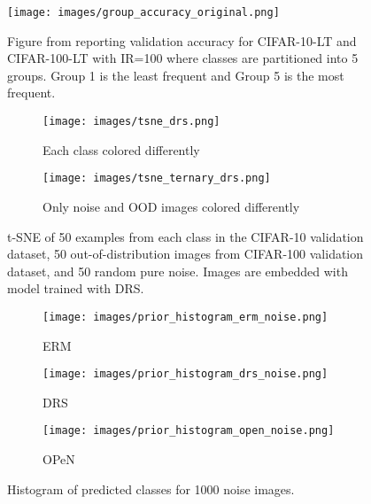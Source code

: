 \begin{figure}[!ht]
    \centering
    \texttt{[image: images/group\_accuracy\_original.png]}
    \caption{Figure from \citet{PureNoise} reporting validation accuracy for CIFAR-10-LT and CIFAR-100-LT with IR=100 where classes are partitioned into 5 groups. Group 1 is the least frequent and Group 5 is the most frequent.}
    \label{fig:group_accuracy_original}
\end{figure}


\begin{figure}[!ht]
    \centering
    \begin{subfigure}[b]{0.49\textwidth}
        \centering
        \texttt{[image: images/tsne\_drs.png]}
        \caption{Each class colored differently}
        \label{fig:tsne_drs}
    \end{subfigure}
    \hfill
    \begin{subfigure}[b]{0.49\textwidth}
        \centering
        \texttt{[image: images/tsne\_ternary\_drs.png]}
        \caption{Only noise and OOD images colored differently}
        \label{fig:tsne_ternary_drs}
    \end{subfigure}
    \caption{t-SNE of 50 examples from each class in the CIFAR-10 validation dataset, 50 out-of-distribution images from CIFAR-100 validation dataset, and 50 random pure noise. Images are embedded with model trained with DRS.}
    \label{fig:tsne_parent_drs}
\end{figure}


\begin{figure}[!ht]
    \centering
    \begin{subfigure}[b]{0.32\textwidth}
        \centering
        \texttt{[image: images/prior\_histogram\_erm\_noise.png]}
        \caption{ERM}
        \label{fig:noise_image_classification_erm}
    \end{subfigure}
    \hfill
    \begin{subfigure}[b]{0.32\textwidth}
        \centering
        \texttt{[image: images/prior\_histogram\_drs\_noise.png]}
        \caption{DRS}
        \label{fig:noise_image_classification_drs}
    \end{subfigure}
    \hfill
    \begin{subfigure}[b]{0.32\textwidth}
        \centering
        \texttt{[image: images/prior\_histogram\_open\_noise.png]}
        \caption{OPeN}
        \label{fig:noise_image_classification_open}
    \end{subfigure}
    \caption{Histogram of predicted classes for 1000 noise images.}
    \label{fig:noise_image_classification}
\end{figure}

